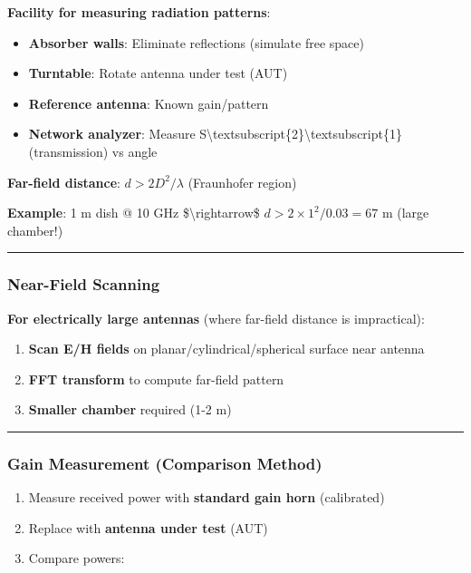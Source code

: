 \textbf{Facility for measuring radiation patterns}:

\begin{itemize}
\tightlist
\item
  \textbf{Absorber walls}: Eliminate reflections (simulate free space)
\item
  \textbf{Turntable}: Rotate antenna under test (AUT)
\item
  \textbf{Reference antenna}: Known gain/pattern
\item
  \textbf{Network analyzer}: Measure
  S\textbackslash textsubscript\{2\}\textbackslash textsubscript\{1\}
  (transmission) vs angle
\end{itemize}

\textbf{Far-field distance}: \(d > 2D^2/\lambda\) (Fraunhofer region)

\textbf{Example}: 1 m dish @ 10 GHz \$\textbackslash rightarrow\$
\(d > 2 \times 1^2 / 0.03 = 67\) m (large chamber!)

\begin{center}\rule{0.5\linewidth}{0.5pt}\end{center}

\subsubsection{Near-Field Scanning}\label{near-field-scanning}

\textbf{For electrically large antennas} (where far-field distance is
impractical):

\begin{enumerate}
\def\labelenumi{\arabic{enumi}.}
\tightlist
\item
  \textbf{Scan E/H fields} on planar/cylindrical/spherical surface near
  antenna
\item
  \textbf{FFT transform} to compute far-field pattern
\item
  \textbf{Smaller chamber} required (1-2 m)
\end{enumerate}

\begin{center}\rule{0.5\linewidth}{0.5pt}\end{center}

\subsubsection{Gain Measurement (Comparison
Method)}\label{gain-measurement-comparison-method}

\begin{enumerate}
\def\labelenumi{\arabic{enumi}.}
\tightlist
\item
  Measure received power with \textbf{standard gain horn} (calibrated)
\item
  Replace with \textbf{antenna under test} (AUT)
\item
  Compare powers:
\end{enumerate}

